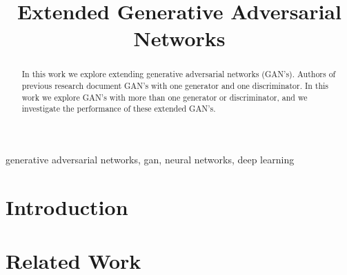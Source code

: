 \documentclass[conference]{IEEEtran}
\begin{document}
\title{Extended Generative Adversarial Networks}

\author{
}


\maketitle

\begin{abstract}
In this work we explore extending generative adversarial networks (GAN's). Authors of 
previous research document GAN's with one generator and one discriminator. In
this work we explore GAN's with more than one generator or discriminator, and
we investigate the performance of these extended GAN's.
\end{abstract}

\begin{IEEEkeywords}
generative adversarial networks, gan, neural networks, deep learning
\end{IEEEkeywords}

\section{Introduction}

\section{Related Work}
\end{document}
